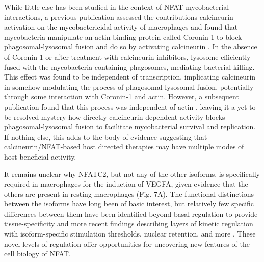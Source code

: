 While little else has been studied in the context of NFAT-mycobacterial interactions, a previous publication assessed the contributions calcineurin activation on the mycobactericidal activity of macrophages and found that mycobacteria manipulate an actin-binding protein called Coronin-1 to block phagosomal-lysosomal fusion and do so by activating calcineurin \citep{Jayachandran2007}. In the absence of Coronin-1 or after treatment with calcineurin inhibitors, lysosome efficiently fused with the mycobacteria-containing phagosomes, mediating bacterial killing. This effect was found to be independent of transcription, implicating calcineurin in somehow modulating the process of phagosomal-lysosomal fusion, potentially through some interaction with Coronin-1 and actin. However, a subsequent publication found that this process was independent of actin \citep{Jayachandran2008}, leaving it a yet-to-be resolved mystery how directly calcineurin-dependent activity blocks phagosomal-lysosomal fusion to facilitate mycobacterial survival and replication. If nothing else, this adds to the body of evidence suggesting that calcineurin/NFAT-based host directed therapies may have multiple modes of host-beneficial activity.

It remains unclear why NFATC2, but not any of the other isoforms, is specifically required in macrophages for the induction of VEGFA, given evidence that the others are present in resting macrophages (Fig. 7A). The functional distinctions between the isoforms have long been of basic interest, but relatively few specific differences between them have been identified beyond basal regulation to provide tissue-specificity and more recent findings describing layers of kinetic regulation with isoform-specific stimulation thresholds, nuclear retention, and more \citep{Lyakh1997, Rao1997, Kar2014, Kar2015, Kar2016, Yissachar2013}. These novel levels of regulation offer opportunities for uncovering new features of the cell biology of NFAT.

